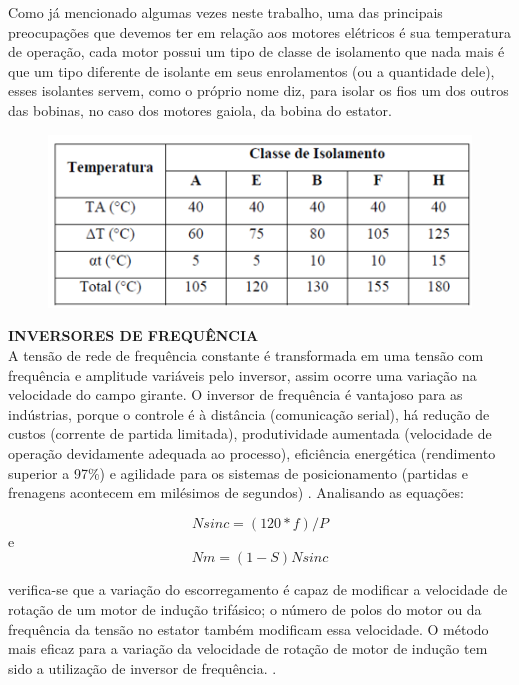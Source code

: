 Como já mencionado algumas vezes neste trabalho, uma das principais preocupações que devemos ter em relação aos motores elétricos é sua temperatura de operação, cada motor possui um tipo de classe de isolamento que nada mais é que um tipo diferente de isolante em seus enrolamentos (ou a quantidade dele), esses isolantes servem, como o próprio nome diz, para isolar os fios um dos outros das bobinas, no caso dos motores gaiola, da bobina do estator.


\begin{figure}[!ht]
\centering
\includegraphics[scale=0.8]{figuras/tabela_isolamento.png}
\label{fig:tabela_isolamento}
\end{figure}


\textbf{INVERSORES DE FREQUÊNCIA}\\

A tensão de rede de frequência constante é transformada em uma tensão com frequência e amplitude variáveis pelo inversor,     assim ocorre uma variação na velocidade do campo girante. O inversor de frequência é vantajoso para as indústrias, porque o controle é à distância (comunicação serial), há redução de custos (corrente de partida limitada), produtividade aumentada (velocidade de operação devidamente adequada ao processo), eficiência energética (rendimento superior a 97\%) e agilidade para os sistemas de posicionamento (partidas e frenagens acontecem em milésimos de segundos) \cite{WEG2}.
    Analisando as equações:
    
    \begin{equation}\label{Rotação Sinc.}
            Nsinc=(120*f)/P
    \end{equation}
    e
    \begin{equation}\label{Rotação Sinc.}
     Nm=(1-S)Nsinc
    \end{equation} 
    
     verifica-se que a variação do escorregamento é capaz de modificar a velocidade de rotação de um motor de indução trifásico; o número de polos do motor ou da frequência da tensão no estator também modificam essa velocidade. O método mais eficaz para a variação da velocidade de rotação de motor de indução tem sido a utilização de inversor de frequência. \cite{WEG2}.  
     
